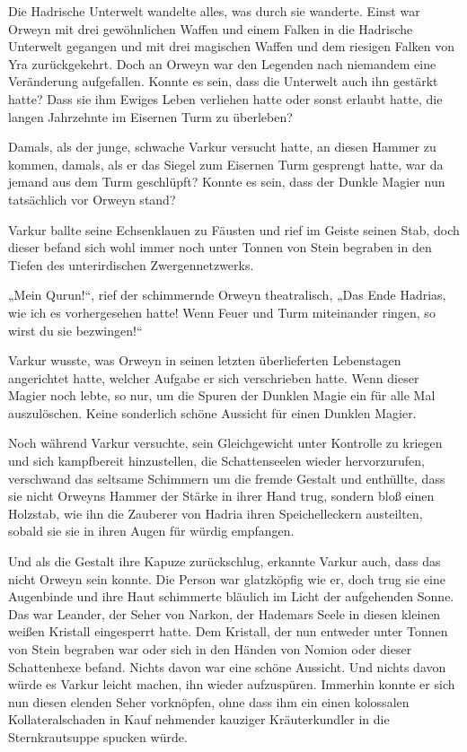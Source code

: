 Die Hadrische Unterwelt wandelte alles, was durch sie wanderte. Einst war Orweyn mit drei gewöhnlichen Waffen und einem Falken in die Hadrische Unterwelt gegangen und mit drei magischen Waffen und dem riesigen Falken von Yra zurückgekehrt. Doch an Orweyn war den Legenden nach niemandem eine Veränderung aufgefallen. Konnte es sein, dass die Unterwelt auch ihn gestärkt hatte? Dass sie ihm Ewiges Leben verliehen hatte oder sonst erlaubt hatte, die langen Jahrzehnte im Eisernen Turm zu überleben?

Damals, als der junge, schwache Varkur versucht hatte, an diesen Hammer zu kommen, damals, als er das Siegel zum Eisernen Turm gesprengt hatte, war da jemand aus dem Turm geschlüpft? Konnte es sein, dass der Dunkle Magier nun tatsächlich vor Orweyn stand?

Varkur ballte seine Echsenklauen zu Fäusten und rief im Geiste seinen Stab, doch dieser befand sich wohl immer noch unter Tonnen von Stein begraben in den Tiefen des unterirdischen Zwergennetzwerks.

„Mein Qurun!“, rief der schimmernde Orweyn theatralisch, „Das Ende Hadrias, wie ich es vorhergesehen hatte! Wenn Feuer und Turm miteinander ringen, so wirst du sie bezwingen!“

Varkur wusste, was Orweyn in seinen letzten überlieferten Lebenstagen angerichtet hatte, welcher Aufgabe er sich verschrieben hatte. Wenn dieser Magier noch lebte, so nur, um die Spuren der Dunklen Magie ein für alle Mal auszulöschen. Keine sonderlich schöne Aussicht für einen Dunklen Magier.

Noch während Varkur versuchte, sein Gleichgewicht unter Kontrolle zu kriegen und sich kampfbereit hinzustellen, die Schattenseelen wieder hervorzurufen, verschwand das seltsame Schimmern um die fremde Gestalt und enthüllte, dass sie nicht Orweyns Hammer der Stärke in ihrer Hand trug, sondern bloß einen Holzstab, wie ihn die Zauberer von Hadria ihren Speichelleckern austeilten, sobald sie sie in ihren Augen für würdig empfangen.

Und als die Gestalt ihre Kapuze zurückschlug, erkannte Varkur auch, dass das nicht Orweyn sein konnte. Die Person war glatzköpfig wie er, doch trug sie eine Augenbinde und ihre Haut schimmerte bläulich im Licht der aufgehenden Sonne. Das war Leander, der Seher von Narkon, der Hademars Seele in diesen kleinen weißen Kristall eingesperrt hatte. Dem Kristall, der nun entweder unter Tonnen von Stein begraben war oder sich in den Händen von Nomion oder dieser Schattenhexe befand. Nichts davon war eine schöne Aussicht. Und nichts davon würde es Varkur leicht machen, ihn wieder aufzuspüren. Immerhin konnte er sich nun diesen elenden Seher vorknöpfen, ohne dass ihm ein einen kolossalen Kollateralschaden in Kauf nehmender kauziger Kräuterkundler in die Sternkrautsuppe spucken würde.

